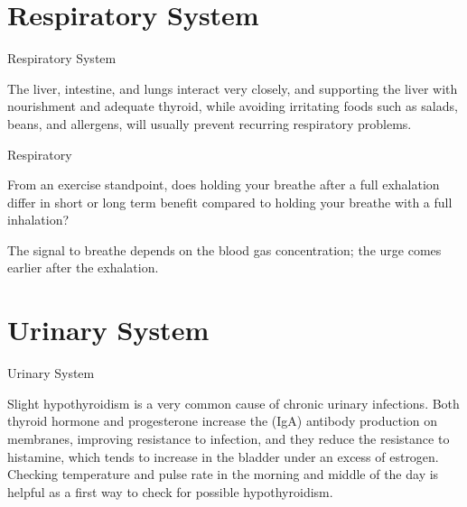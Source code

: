 \documentclass[11pt,oneside,openany,extrafontsizes]{memoir}
\begin{document}
\section{Respiratory System}

\begin{standalonequote}{Respiratory System}

    \begin{answer}
        The liver, intestine, and lungs interact very closely, and supporting the liver with nourishment and adequate thyroid, while avoiding irritating foods such as salads, beans, and allergens, will usually prevent recurring respiratory problems.
    \end{answer}
\end{standalonequote}

\begin{qaexchange}{Respiratory}

    \begin{question}
        From an exercise standpoint, does holding your breathe after a full exhalation differ in short or long term benefit compared to holding your breathe with a full inhalation?
    \end{question}

    \begin{answer}
        The signal to breathe depends on the blood gas concentration; the urge comes earlier after the exhalation.
    \end{answer}
\end{qaexchange}

\section{Urinary System}

\begin{standalonequote}{Urinary System}

    \begin{answer}
        Slight hypothyroidism is a very common cause of chronic urinary infections. Both thyroid hormone and progesterone increase the (IgA) antibody production on membranes, improving resistance to infection, and they reduce the resistance to histamine, which tends to increase in the bladder under an excess of estrogen. Checking temperature and pulse rate in the morning and middle of the day is helpful as a first way to check for possible hypothyroidism.
    \end{answer}
\end{standalonequote}
\end{document}

